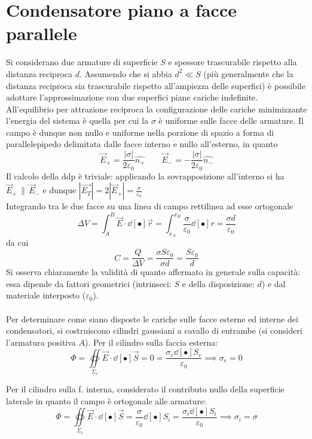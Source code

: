 \section{Condensatore piano a facce parallele}
Si considerano due armature di superficie $S$ e spessore trascurabile rispetto alla distanza reciproca $d$. Assumendo che si abbia $d^2 \ll S$ (più generalmente che la distanza reciproca sia trascurabile rispetto all'ampiezza delle superfici) è possibile adottare l'approssimazione con due superfici piane cariche indefinite.
\\All'equilibrio per attrazione reciproca la configurazione delle cariche minimizzante l'energia del sistema è quella per cui la $\sigma$ è uniforme sulle facce delle armature. Il campo è dunque non nullo e uniforme nella porzione di spazio a forma di parallelepipedo delimitata dalle facce interno e nullo all'esterno, in quanto
\[\vec{E}_+ = \frac{|\sigma|}{2 \varepsilon_0} \hat{n_+} \qquad \vec{E}_- = - \frac{|\sigma|}{2 \varepsilon_0} \hat{n_-}\]
Il calcolo della ddp è triviale: applicando la sovrapposizione all'interno si ha $\vec{E}_+ \, \parallel \, \vec{E}_-$ e dunque $|\vec{E_T}| = 2 |\vec{E}_+| = \frac{\sigma}{\varepsilon_0}$
\\Integrando tra le due facce su una linea di campo rettilinea ad esse ortogonale
\[\Delta V = \int_A^B \vec{E} \cdot \dd[•]{\vec{r}} = \int_{x_A}^{x_B} \frac{\sigma}{\varepsilon_0} \dd[•]{r} = \frac{\sigma d}{\varepsilon_0}\]
da cui
\[C = \frac{Q}{\Delta V} = \frac{\sigma S \varepsilon_0}{\sigma d} = \frac{S \varepsilon_0}{d}\]
Si osserva chiaramente la validità di quanto affermato in generale sulla capacità: essa dipende da fattori geometrici (intrinseci: $S$ e della disposizione: $d$) e dal materiale interposto ($\varepsilon_0$).
\\~\\
Per determinare come siano disposte le cariche sulle facce esterne ed interne dei condensatori, si costruiscono cilindri gaussiani a cavallo di entrambe (si consideri l'armatura positiva $A$). Per il cilindro sulla faccia esterna:
\[\Phi = \oiint\limits_{\Sigma_e} \vec{E} \cdot \dd[•]{\vec{S}} = 0 = \frac{\sigma_e \dd[•]{S_e}}{\varepsilon_0} \implies \sigma_e = 0\]


Per il cilindro sulla f. interna, considerato il contributo nullo della superficie laterale in quanto il campo è ortogonale alle armature:
\[\Phi = \oiint\limits_{\Sigma_i} \vec{E} \cdot \dd[•]{\vec{S}} = \frac{\sigma}{\varepsilon_0}  \dd[•]{S_i} = \frac{\sigma_i \dd[•]{S_i}}{\varepsilon_0} \implies \sigma_i = \sigma\]

